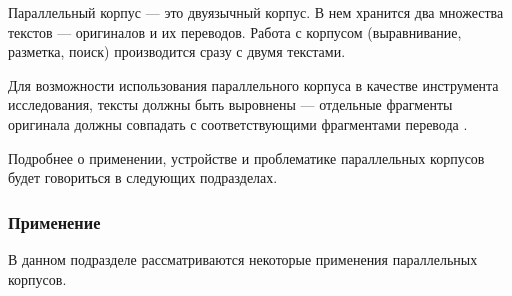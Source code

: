 Параллельный корпус --- это двуязычный корпус.
В нем хранится два множества текстов --- оригиналов и их переводов.
Работа с корпусом (выравнивание, разметка, поиск) производится сразу с двумя текстами. %

Для возможности использования параллельного корпуса в качестве инструмента исследования, тексты должны быть выровнены --- отдельные фрагменты оригинала должны совпадать с соответствующими фрагментами перевода \cite{postnauka}.

Подробнее о применении, устройстве и проблематике параллельных корпусов будет говориться в следующих подразделах.

\subsubsection{Применение}

В данном подразделе рассматриваются некоторые применения параллельных корпусов.





